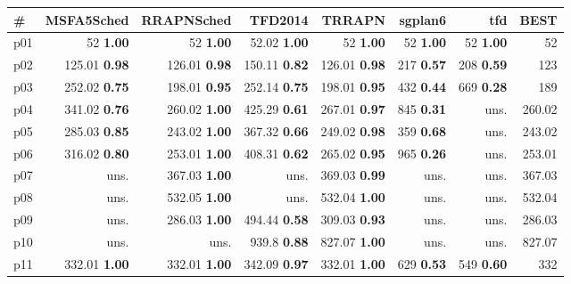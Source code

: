 \begin{tabular}{|l|rrrrrr|r|}
\hline
\textbf{\#} & \textbf{MSFA5Sched} & \textbf{RRAPNSched} & \textbf{TFD2014} & \textbf{TRRAPN} & \textbf{sgplan6} & \textbf{tfd} & \textbf{BEST}\\
\hline
p01 & {\footnotesize 52} \textbf{1.00} & {\footnotesize 52} \textbf{1.00} & {\footnotesize 52.02} \textbf{1.00} & {\footnotesize 52} \textbf{1.00} & {\footnotesize 52} \textbf{1.00} & {\footnotesize 52} \textbf{1.00} & 52\\
p02 & {\footnotesize 125.01} \textbf{0.98} & {\footnotesize 126.01} \textbf{0.98} & {\footnotesize 150.11} \textbf{0.82} & {\footnotesize 126.01} \textbf{0.98} & {\footnotesize 217} \textbf{0.57} & {\footnotesize 208} \textbf{0.59} & 123\\
p03 & {\footnotesize 252.02} \textbf{0.75} & {\footnotesize 198.01} \textbf{0.95} & {\footnotesize 252.14} \textbf{0.75} & {\footnotesize 198.01} \textbf{0.95} & {\footnotesize 432} \textbf{0.44} & {\footnotesize 669} \textbf{0.28} & 189\\
p04 & {\footnotesize 341.02} \textbf{0.76} & {\footnotesize 260.02} \textbf{1.00} & {\footnotesize 425.29} \textbf{0.61} & {\footnotesize 267.01} \textbf{0.97} & {\footnotesize 845} \textbf{0.31} & uns. & 260.02\\
p05 & {\footnotesize 285.03} \textbf{0.85} & {\footnotesize 243.02} \textbf{1.00} & {\footnotesize 367.32} \textbf{0.66} & {\footnotesize 249.02} \textbf{0.98} & {\footnotesize 359} \textbf{0.68} & uns. & 243.02\\
p06 & {\footnotesize 316.02} \textbf{0.80} & {\footnotesize 253.01} \textbf{1.00} & {\footnotesize 408.31} \textbf{0.62} & {\footnotesize 265.02} \textbf{0.95} & {\footnotesize 965} \textbf{0.26} & uns. & 253.01\\
p07 & uns. & {\footnotesize 367.03} \textbf{1.00} & uns. & {\footnotesize 369.03} \textbf{0.99} & uns. & uns. & 367.03\\
p08 & uns. & {\footnotesize 532.05} \textbf{1.00} & uns. & {\footnotesize 532.04} \textbf{1.00} & uns. & uns. & 532.04\\
p09 & uns. & {\footnotesize 286.03} \textbf{1.00} & {\footnotesize 494.44} \textbf{0.58} & {\footnotesize 309.03} \textbf{0.93} & uns. & uns. & 286.03\\
p10 & uns. & uns. & {\footnotesize 939.8} \textbf{0.88} & {\footnotesize 827.07} \textbf{1.00} & uns. & uns. & 827.07\\
p11 & {\footnotesize 332.01} \textbf{1.00} & {\footnotesize 332.01} \textbf{1.00} & {\footnotesize 342.09} \textbf{0.97} & {\footnotesize 332.01} \textbf{1.00} & {\footnotesize 629} \textbf{0.53} & {\footnotesize 549} \textbf{0.60} & 332\\

\end{tabular}
